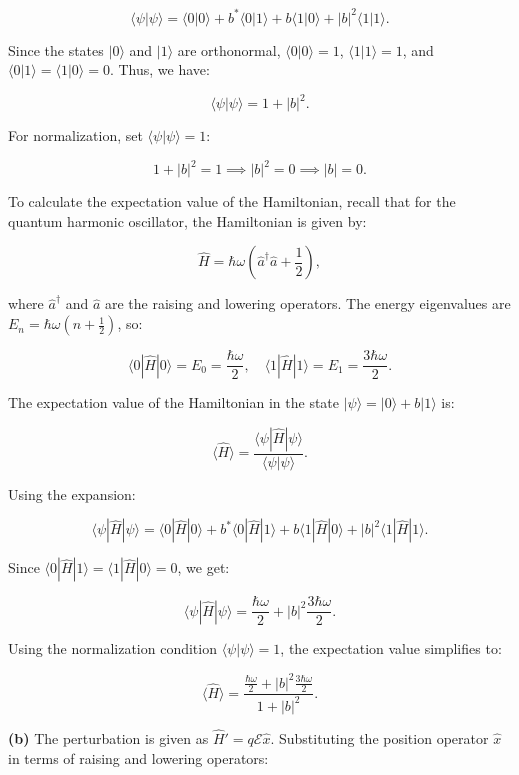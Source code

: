 \[
\langle \psi | \psi \rangle = \langle 0 | 0 \rangle + b^* \langle 0 | 1 \rangle + b \langle 1 | 0 \rangle + |b|^2 \langle 1 | 1 \rangle.
\]

Since the states \(|0\rangle\) and \(|1\rangle\) are orthonormal, \(\langle 0 | 0 \rangle = 1\), \(\langle 1 | 1 \rangle = 1\), and \(\langle 0 | 1 \rangle = \langle 1 | 0 \rangle = 0\). Thus, we have:

\[
\langle \psi | \psi \rangle = 1 + |b|^2.
\]

For normalization, set \(\langle \psi | \psi \rangle = 1\):

\[
1 + |b|^2 = 1 \implies |b|^2 = 0 \implies |b| = 0.
\]

To calculate the expectation value of the Hamiltonian, recall that for the quantum harmonic oscillator, the Hamiltonian is given by:

\[
\hat{H} = \hbar \omega \left( \hat{a}^\dagger \hat{a} + \frac{1}{2} \right),
\]

where \(\hat{a}^\dagger\) and \(\hat{a}\) are the raising and lowering operators. The energy eigenvalues are \(E_n = \hbar \omega \left( n + \frac{1}{2} \right)\), so:

\[
\langle 0 | \hat{H} | 0 \rangle = E_0 = \frac{\hbar \omega}{2}, \quad \langle 1 | \hat{H} | 1 \rangle = E_1 = \frac{3 \hbar \omega}{2}.
\]

The expectation value of the Hamiltonian in the state \(|\psi\rangle = |0\rangle + b|1\rangle\) is:

\[
\langle \hat{H} \rangle = \frac{\langle \psi | \hat{H} | \psi \rangle}{\langle \psi | \psi \rangle}.
\]

Using the expansion:

\[
\langle \psi | \hat{H} | \psi \rangle = \langle 0 | \hat{H} | 0 \rangle + b^* \langle 0 | \hat{H} | 1 \rangle + b \langle 1 | \hat{H} | 0 \rangle + |b|^2 \langle 1 | \hat{H} | 1 \rangle.
\]

Since \(\langle 0 | \hat{H} | 1 \rangle = \langle 1 | \hat{H} | 0 \rangle = 0\), we get:

\[
\langle \psi | \hat{H} | \psi \rangle = \frac{\hbar \omega}{2} + |b|^2 \frac{3 \hbar \omega}{2}.
\]

Using the normalization condition \(\langle \psi | \psi \rangle = 1\), the expectation value simplifies to:

\[
\langle \hat{H} \rangle = \frac{\frac{\hbar \omega}{2} + |b|^2 \frac{3 \hbar \omega}{2}}{1 + |b|^2}.
\]

\textbf{(b)} The perturbation is given as \(\hat{H}' = q \mathcal{E} \hat{x}\). Substituting the position operator \(\hat{x}\) in terms of raising and lowering operators:

